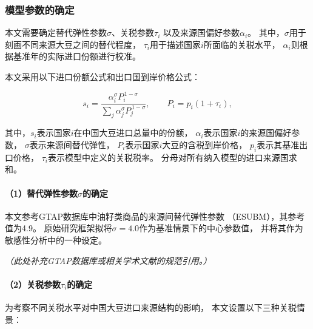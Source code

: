 \documentclass{apmcmthesis}
\begin{document}
\subsubsection{模型参数的确定}

本文需要确定替代弹性参数$\sigma$、关税参数$\tau_i$
以及来源国偏好参数$\alpha_i$。
其中，$\sigma$用于刻画不同来源大豆之间的替代程度，
$\tau_i$用于描述国家$i$所面临的关税水平，
$\alpha_i$则根据基准年的实际进口份额进行校准。

本文采用以下进口份额公式和出口国到岸价格公式：

\begin{equation}
    s_i =
    \frac{\alpha_i^{\sigma}P_i^{\,1-\sigma}}
    {\displaystyle\sum_j \alpha_j^{\sigma}P_j^{\,1-\sigma}},
    \qquad
    P_i=p_i(1+\tau_i),
    \label{eq:ces_import_share}
\end{equation}

其中，$s_i$表示国家$i$在中国大豆进口总量中的份额，
$\alpha_i$表示国家$i$的来源国偏好参数，
$\sigma$表示来源间替代弹性，
$P_i$表示国家$i$大豆的含税到岸价格，
$p_i$表示其基准出口价格，
$\tau_i$表示模型中定义的关税税率。
分母对所有纳入模型的进口来源国求和。

\paragraph{（1）替代弹性参数$\sigma$的确定}

本文参考GTAP数据库中油籽类商品的来源间替代弹性参数
（ESUBM），其参考值为4.9。
原始研究框架拟将$\sigma=4.0$作为基准情景下的中心参数值，
并将其作为敏感性分析中的一种设定。

\textit{（此处补充GTAP数据库或相关学术文献的规范引用。）}

\paragraph{（2）关税参数$\tau_i$的确定}

为考察不同关税水平对中国大豆进口来源结构的影响，
本文设置以下三种关税情景：
\end{document}
